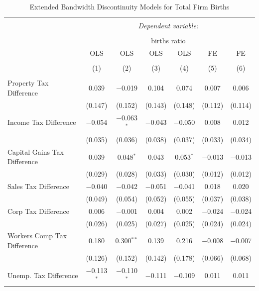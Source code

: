 \documentclass[12pt,a4paper]{article}
\begin{document}
\begin{landscape}
\begin{table}[!htbp] \centering 
  \caption{Extended Bandwidth Discontinuity Models for  Total Firm Births} 
  \label{--eb} 
\begin{tabular}{@{\extracolsep{5pt}}lcccccc} 
\\[-1.8ex]\hline 
\hline \\[-1.8ex] 
 & \multicolumn{6}{c}{\textit{Dependent variable:}} \\ 
\cline{2-7} 
\\[-1.8ex] & \multicolumn{6}{c}{births ratio} \\ 
 & OLS & OLS & OLS & OLS & FE & FE \\ 
\\[-1.8ex] & (1) & (2) & (3) & (4) & (5) & (6)\\ 
\hline \\[-1.8ex] 
 Property Tax Difference & 0.039 & $-$0.019 & 0.104 & 0.074 & 0.007 & 0.006 \\ 
  & (0.147) & (0.152) & (0.143) & (0.148) & (0.112) & (0.114) \\ 
  Income Tax Difference & $-$0.054 & $-$0.063$^{*}$ & $-$0.043 & $-$0.050 & 0.008 & 0.012 \\ 
  & (0.035) & (0.036) & (0.038) & (0.037) & (0.033) & (0.034) \\ 
  Capital Gains Tax Difference & 0.039 & 0.048$^{*}$ & 0.043 & 0.053$^{*}$ & $-$0.013 & $-$0.013 \\ 
  & (0.029) & (0.028) & (0.033) & (0.030) & (0.012) & (0.012) \\ 
  Sales Tax Difference & $-$0.040 & $-$0.042 & $-$0.051 & $-$0.041 & 0.018 & 0.020 \\ 
  & (0.049) & (0.054) & (0.052) & (0.055) & (0.037) & (0.038) \\ 
  Corp Tax Difference & 0.006 & $-$0.001 & 0.004 & 0.002 & $-$0.024 & $-$0.024 \\ 
  & (0.026) & (0.025) & (0.027) & (0.025) & (0.024) & (0.024) \\ 
  Workers Comp Tax Difference & 0.180 & 0.300$^{**}$ & 0.139 & 0.216 & $-$0.008 & $-$0.007 \\ 
  & (0.126) & (0.152) & (0.142) & (0.178) & (0.066) & (0.068) \\ 
  Unemp. Tax Difference & $-$0.113$^{*}$ & $-$0.110$^{*}$ & $-$0.111 & $-$0.109 & 0.011 & 0.011 \\ 

\end{tabular}
\end{table}
\end{landscape}
\end{document}
